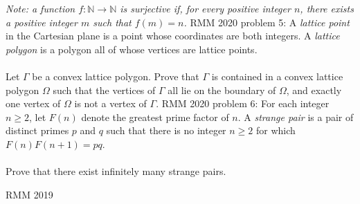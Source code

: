 \textit{Note: a function $f:\mathbb N\to\mathbb N$ is surjective if, for every positive integer $n$, there exists a positive integer $m$ such that $f(m)=n$.} 
RMM 2020 problem 5:  A \textit{lattice point} in the Cartesian plane is a point whose coordinates are both integers. A \textit{lattice polygon} is a polygon all of whose vertices are lattice points. \\\\
Let $\Gamma$ be a convex lattice polygon. Prove that $\Gamma$ is contained in a convex lattice polygon $\Omega$ such that the vertices of $\Gamma$ all lie on the boundary of $\Omega$, and exactly one vertex of $\Omega$ is not a vertex of $\Gamma$. 
RMM 2020 problem 6:  For each integer $n \geq 2$, let $F(n)$ denote the greatest prime factor of $n$. A \textit{strange pair} is a pair of distinct primes $p$ and $q$ such that there is no integer $n \geq 2$ for which $F(n)F(n+1)=pq$. \\\\
Prove that there exist infinitely many strange pairs. 

RMM 2019 

